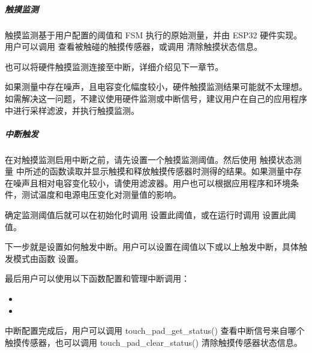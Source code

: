 \documentclass[a4paper,12pt,english]{sphinxmanual}
\begin{document}
{{\subparagraph{触摸监测}
\label{\detokenize{exp-esp32/peripherals/touch:id7}}
\sphinxAtStartPar
触摸监测基于用户配置的阈值和 FSM 执行的原始测量，并由 ESP32 硬件实现。用户可以调用  查看被触碰的触摸传感器，或调用  清除触摸状态信息。

\sphinxAtStartPar
也可以将硬件触摸监测连接至中断，详细介绍见下一章节。

\sphinxAtStartPar
如果测量中存在噪声，且电容变化幅度较小，硬件触摸监测结果可能就不太理想。如需解决这一问题，不建议使用硬件监测或中断信号，建议用户在自己的应用程序中进行采样滤波，并执行触摸监测。


\subparagraph{中断触发}
\label{\detokenize{exp-esp32/peripherals/touch:id8}}
\sphinxAtStartPar
在对触摸监测启用中断之前，请先设置一个触摸监测阈值。然后使用 触摸状态测量 中所述的函数读取并显示触摸和释放触摸传感器时测得的结果。如果测量中存在噪声且相对电容变化较小，请使用滤波器。用户也可以根据应用程序和环境条件，测试温度和电源电压变化对测量值的影响。

\sphinxAtStartPar
确定监测阈值后就可以在初始化时调用 设置此阈值，或在运行时调用  设置此阈值。

\sphinxAtStartPar
下一步就是设置如何触发中断。用户可以设置在阈值以下或以上触发中断，具体触发模式由函数 设置。

\sphinxAtStartPar
最后用户可以使用以下函数配置和管理中断调用：
\begin{itemize}
\item {} 
\sphinxAtStartPar
{}

\item {} 
\sphinxAtStartPar
{}

\end{itemize}

\sphinxAtStartPar
中断配置完成后，用户可以调用 touch\_pad\_get\_status() 查看中断信号来自哪个触摸传感器，也可以调用 touch\_pad\_clear\_status() 清除触摸传感器状态信息。
\begin{quote}

\sphinxAtStartPar
{}

\sphinxAtStartPar
{}
\end{quote}


}}
\end{document}
